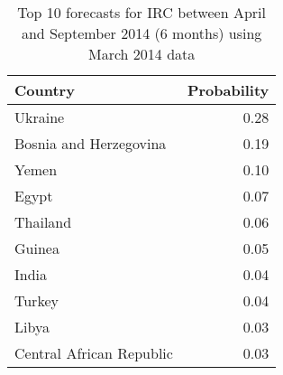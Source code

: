 \begin{table}[ht]
\centering
\begin{tabular}{lr}
  \hline
Country & Probability \\ 
  \hline
Ukraine & 0.28 \\ 
  Bosnia and Herzegovina & 0.19 \\ 
  Yemen & 0.10 \\ 
  Egypt & 0.07 \\ 
  Thailand & 0.06 \\ 
  Guinea & 0.05 \\ 
  India & 0.04 \\ 
  Turkey & 0.04 \\ 
  Libya & 0.03 \\ 
  Central African Republic & 0.03 \\ 
   \hline
\end{tabular}
\caption{Top 10 forecasts for IRC between April and September 2014 (6 months) using March 2014 data} 
\label{tab:forecast}
\end{table}

